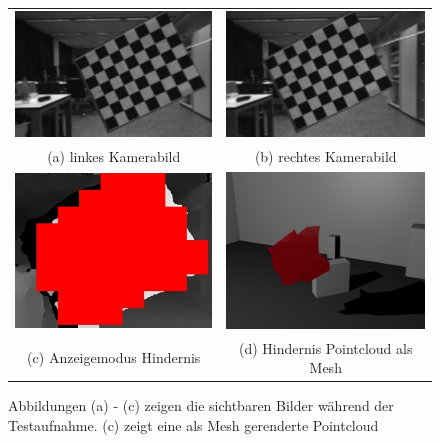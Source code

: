 \begin{figure}[h]
	\centering
	\begin{tabular}{c c}
	\includegraphics[width=5.5cm]{img/evaluation/test_set/_test_3_left}&
	\includegraphics[width=5.5cm]{img/evaluation/test_set/_test_3_right}\\
	(a) linkes Kamerabild & (b) rechtes Kamerabild\\
	\includegraphics[width=5.5cm]{img/evaluation/test_set/_test_3_disparity}&
    \includegraphics[width=5.5cm]{img/evaluation/test_set/rendered_obstacle}\\
	(c) Anzeigemodus Hindernis & (d) Hindernis Pointcloud als Mesh
	\end{tabular}
	\caption{Abbildungen (a) - (c) zeigen die sichtbaren Bilder während der Testaufnahme. (c) zeigt eine als Mesh gerenderte Pointcloud}
	\label{fig:test_viewing}
\end{figure}


